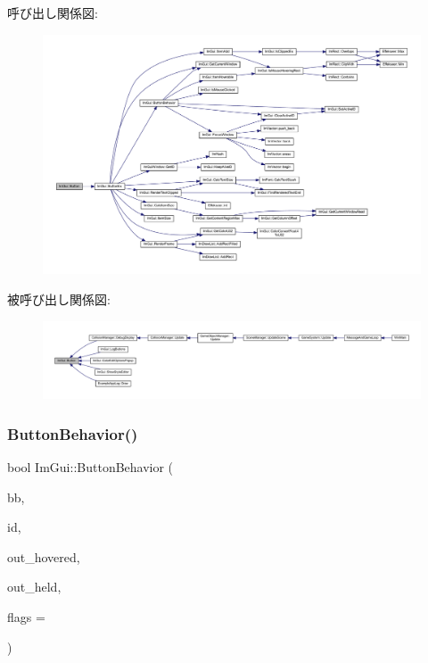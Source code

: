呼び出し関係図\+:\nopagebreak
\begin{figure}[H]
\begin{center}
\leavevmode
\includegraphics[width=350pt]{namespace_im_gui_a38094c568ce398db5a3abb9d3ac92030_cgraph}
\end{center}
\end{figure}
被呼び出し関係図\+:
\nopagebreak
\begin{figure}[H]
\begin{center}
\leavevmode
\includegraphics[width=350pt]{namespace_im_gui_a38094c568ce398db5a3abb9d3ac92030_icgraph}
\end{center}
\end{figure}
\mbox{\label{namespace_im_gui_a65a4f18b1bc8ce0f351687922089f374}} 
\subsubsection{\texorpdfstring{Button\+Behavior()}{ButtonBehavior()}}
{\footnotesize\ttfamily bool Im\+Gui\+::\+Button\+Behavior (\begin{DoxyParamCaption}\item[{const \mbox{\hyperlink{struct_im_rect}{Im\+Rect}} \&}]{bb,  }\item[{\mbox{\hyperlink{imgui_8h_a1785c9b6f4e16406764a85f32582236f}{Im\+Gui\+ID}}}]{id,  }\item[{bool $\ast$}]{out\+\_\+hovered,  }\item[{bool $\ast$}]{out\+\_\+held,  }\item[{\mbox{\hyperlink{imgui__internal_8h_a990fae518aa1d95f571ee40989de4c22}{Im\+Gui\+Button\+Flags}}}]{flags = {} }\end{DoxyParamCaption})}



